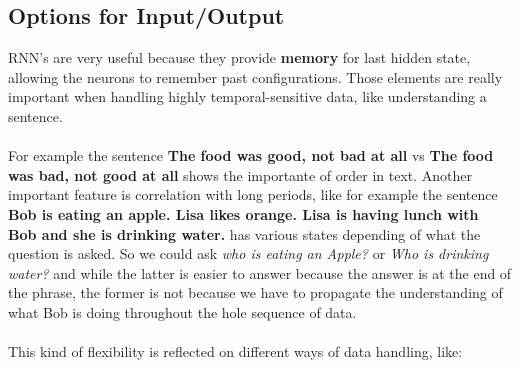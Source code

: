 \documentclass[12pt]{article}
\begin{document}
\subsection{Options for Input/Output}
RNN's are very useful because they provide \textbf{memory} for last hidden state, allowing the neurons to remember past configurations. Those elements are really important when handling highly temporal-sensitive data, like understanding a sentence. \mbox{}
\\\\
For example the sentence \textbf{The food was good, not bad at all} vs \textbf{The food was bad, not good at all} shows the importante of order in text. Another important feature is correlation with long periods, like for example the sentence \textbf{Bob is eating an apple. Lisa likes orange. Lisa is having lunch with Bob and she is drinking water.} has various states depending of what the question is asked. So we could ask \textit{who is eating an Apple?} or \textit{Who is drinking water?} and while the latter is easier to answer because the answer is at the end of the phrase, the former is not because we have to propagate the understanding of what Bob is doing throughout the hole sequence of data.
\\\\
This kind of flexibility is reflected on different ways of data handling, like:
\end{document}
